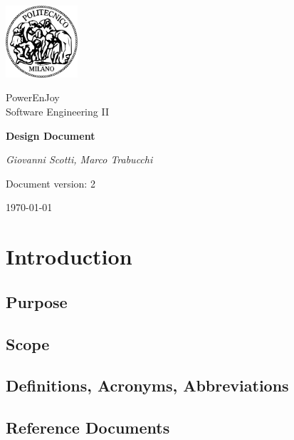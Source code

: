 \documentclass[a4paper,12pt]{report}
\begin{document}
\begin{titlepage}
\centering
\includegraphics[width=0.20\textwidth]{./pictures/logo_poli}\par
	\vspace{1.5cm}
	{\Large {PowerEnJoy \\ 
		Software Engineering II} \par}
	\vspace{1.5cm}
	{\LARGE \textbf{Design Document} \par}
	\vspace{1.5cm}
	{\Large\itshape Giovanni Scotti, Marco Trabucchi\par}
	\vspace{2cm}
	\vfill
	{\large Document version: 2\par}
	{\large \today \par}
\end{titlepage}

\tableofcontents

\chapter{Introduction}
\label{ch:Introduction}

\section{Purpose}


\section{Scope}


\section{Definitions, Acronyms, Abbreviations}


\section{Reference Documents}

\end{document}
